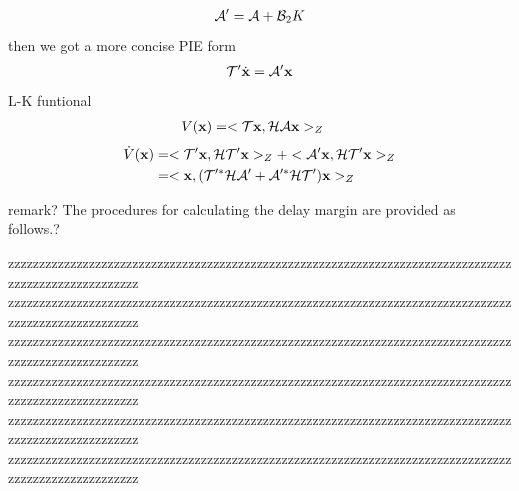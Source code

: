 \documentclass[twocolumn]{autart}    %
\begin{document}
\begin{pf}
    \begin{equation}
        \begin{aligned}
            \setlength{\arraycolsep}{0.9pt}
            \mathcal{A}' = \mathcal{A}+\mathcal{B}_{2}K
        \end{aligned}
    \end{equation}
    then we got a more concise PIE form
    \begin{equation}
        \begin{aligned}
            \setlength{\arraycolsep}{0.9pt}
            \mathcal{T}'\dot{\bold{x}} = \mathcal{A}'\bold{x}
        \end{aligned}
    \end{equation}
    L-K funtional 
    \begin{equation}
        \begin{aligned}
            \setlength{\arraycolsep}{0.9pt}
            V(\bold{x}) &= <\mathcal{T}\bold{x},\mathcal{H}\mathcal{A}\bold{x}>_{Z} 
        \end{aligned}
    \end{equation}
    \begin{equation}
        \begin{aligned}
            \setlength{\arraycolsep}{0.9pt}
            \dot{V}(\bold{x}) &= <\mathcal{T}'\bold{x},\mathcal{H}\mathcal{T}'\bold{x}>_{Z} + <\mathcal{A}'\bold{x},\mathcal{H}\mathcal{T}'\bold{x}>_{Z} \\ &=<\bold{x},(\mathcal{T}'^{*}\mathcal{H}\mathcal{A}'+\mathcal{A}'^{*}\mathcal{H}\mathcal{T}')\bold{x}>_{Z}  
        \end{aligned}
    \end{equation}
\end{pf}

remark?
The procedures for calculating the delay margin are provided as follows.?

zzzzzzzzzzzzzzzzzzzzzzzzzzzzzzzzzzzzzzzzzzzzzzzzzzzzzzzzzzzzzzzzzzzzzzzzzzzzzzzzzzzzzzzzzzzzzzzzzzzzzz
zzzzzzzzzzzzzzzzzzzzzzzzzzzzzzzzzzzzzzzzzzzzzzzzzzzzzzzzzzzzzzzzzzzzzzzzzzzzzzzzzzzzzzzzzzzzzzzzzzzzzz
zzzzzzzzzzzzzzzzzzzzzzzzzzzzzzzzzzzzzzzzzzzzzzzzzzzzzzzzzzzzzzzzzzzzzzzzzzzzzzzzzzzzzzzzzzzzzzzzzzzzzz
zzzzzzzzzzzzzzzzzzzzzzzzzzzzzzzzzzzzzzzzzzzzzzzzzzzzzzzzzzzzzzzzzzzzzzzzzzzzzzzzzzzzzzzzzzzzzzzzzzzzzz
zzzzzzzzzzzzzzzzzzzzzzzzzzzzzzzzzzzzzzzzzzzzzzzzzzzzzzzzzzzzzzzzzzzzzzzzzzzzzzzzzzzzzzzzzzzzzzzzzzzzzz
zzzzzzzzzzzzzzzzzzzzzzzzzzzzzzzzzzzzzzzzzzzzzzzzzzzzzzzzzzzzzzzzzzzzzzzzzzzzzzzzzzzzzzzzzzzzzzzzzzzzzz
\end{document}
